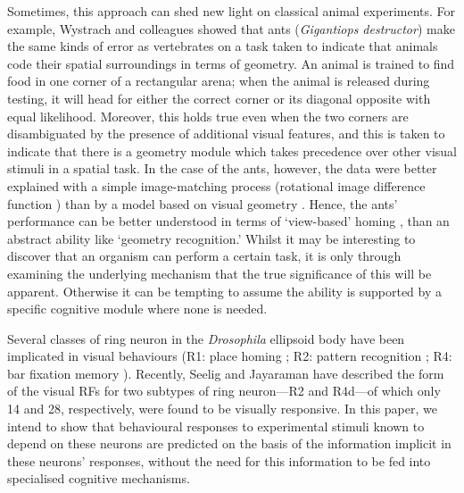 Sometimes, this approach can shed new light on classical animal experiments.
For example, Wystrach and colleagues \cite{Wystrach2011} showed that ants (\emph{Gigantiops destructor}) make the same kinds of error as vertebrates on a task taken to indicate that animals code their spatial surroundings in terms of geometry.
An animal is trained to find food in one corner of a rectangular arena; when the animal is released during testing, it will head for either the correct corner or its diagonal opposite with equal likelihood.
Moreover, this holds true even when the two corners are disambiguated by the presence of additional visual features, and this is taken to indicate that there is a geometry module which takes precedence over other visual stimuli in a spatial task.
In the case of the ants, however, the data were better explained with a simple image-matching process (rotational image difference function \cite{Philippides2011,Zeil2003}) than by a model based on visual geometry \cite{Wystrach2011}.
Hence, the ants' performance can be better understood in terms of `view-based' homing \cite{Wystrach2013,Philippides2011,Baddeley2011,Lent2010}, than an abstract ability like `geometry recognition.'
Whilst it may be interesting to discover that an organism can perform a certain task, it is only through examining the underlying mechanism that the true significance of this will be apparent.
Otherwise it can be tempting to assume the ability is supported by a specific cognitive module \cite{Fodor1983} where none is needed.

Several classes of ring neuron in the \emph{Drosophila} ellipsoid body have been implicated in visual behaviours (R1: place homing \cite{Ofstad2011,Sitaraman2010,Sitaraman2008}; R2: pattern recognition \cite{Pan2009,Liu2006,Ernst1999}; R4: bar fixation memory \cite{Neuser2008}).
Recently, Seelig and Jayaraman \cite{Seelig2013} have described the form of the visual \acp{RF} for two subtypes of ring neuron---R2 and R4d---of which only 14 and 28, respectively, were found to be visually responsive.
In this paper, we intend to show that behavioural responses to experimental stimuli known to depend on these neurons are predicted on the basis of the information implicit in these neurons' responses, without the need for this information to be fed into specialised cognitive mechanisms.


